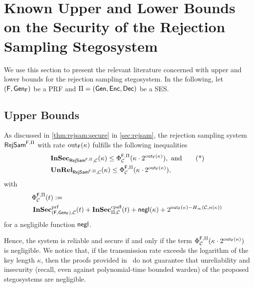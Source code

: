 \section{Known Upper and Lower Bounds on the Security of the Rejection
  Sampling Stegosystem}
We use this section to present the relevant literature concerned with
upper and lower bounds for the rejection sampling stegosystem.
In the following, let $(\operatorname{\mathsf{F}},\operatorname{\mathsf{Gen}}_{\operatorname{\mathsf{F}}})$ be a \acl{PRF} and
$\Pi=(\operatorname{\mathsf{Gen}},\operatorname{\mathsf{Enc}},\operatorname{\mathsf{Dec}})$ be a \acl{SES}.  
\subsection*{Upper Bounds}
As discussed in
\autoref{thm:rejsam:secure} in \autoref{sec:rejsam}, the rejection
sampling system $\operatorname{\mathsf{RejSam}}^{\operatorname{\mathsf{F}},\Pi}$ with rate $\operatorname{out}_{\operatorname{\mathsf{F}}}(\kappa)$ fulfills the following
inequalities
\begin{align*}
    & \operatorname{\mathbf{InSec}}_{\operatorname{\mathsf{RejSam}}^{\operatorname{\mathsf{F}},\Pi},\mathcal{C}}(\kappa) \leq \Phi_{\mathcal{C}}^{\operatorname{\mathsf{F}},\Pi}(\kappa\cdot
    2^{\operatorname{out}_{\operatorname{\mathsf{F}}}(\kappa)}), \text{ and}\tag{*}\label{eq:insec:hopper}\\
  & \operatorname{\mathbf{UnRel}}_{\operatorname{\mathsf{RejSam}}^{\operatorname{\mathsf{F}},\Pi},\mathcal{C}}(\kappa) \leq \Phi_{\mathcal{C}}^{\operatorname{\mathsf{F}},\Pi}(\kappa\cdot 2^{\operatorname{out}_{\operatorname{\mathsf{F}}}(\kappa)}),
\end{align*}
with
\begin{align*}
  &\Phi_{\chan}^{\algf,\Pi}(t)  :=\\
  &\InSec^{\prf}_{(\algf,\Gen_{\algf}),\chan}(t)+\InSec^{\cpad}_{\Pi,\chan}(t)+\negl(\kappa)+2^{\fout_{\algf}(\kappa)-\minent(\chan,n(\kappa))}
\end{align*}
for a negligible function $\operatorname{\mathsf{negl}}$. 

Hence, the system is reliable and secure if and only if the term
$\Phi_{\mathcal{C}}^{\operatorname{\mathsf{F}},\Pi}(\kappa\cdot 2^{\operatorname{out}_{\operatorname{\mathsf{F}}}(\kappa)})$ is negligible. We
notice that, if the transmission rate exceeds the logarithm of the key
length $\kappa$, then the proofs provided in~\cite{hopper2009provably}
do not guarantee that unreliability and insecurity (recall, even against
polynomial-time bounded warden) of the proposed stegosystems are
negligible.

